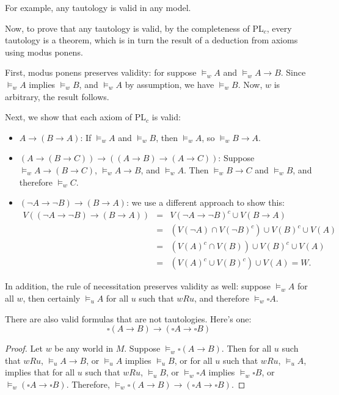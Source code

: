 \documentclass[12pt]{article}
\begin{document}
For example, any tautology is valid in any model.

Now, to prove that any tautology is valid, by the completeness of PL$_c$, every tautology is a theorem, which is in turn  the result of a deduction from axioms using modus ponens.

First, modus ponens preserves validity: for suppose $\models_w A$ and $\models_w A\to B$.  Since $\models_w A$ implies $\models_w B$, and $\models_w A$ by assumption, we have $\models_w B$.  Now, $w$ is arbitrary, the result follows.

Next, we show that each axiom of PL$_c$ is valid:
\begin{itemize}
\item $A\to (B\to A)$: If $\models_w A$ and $\models_w B$, then $\models_w A$, so $\models_w B\to A$.
\item $(A\to (B\to C))\to ((A\to B)\to (A\to C))$: Suppose $\models_w A\to (B\to C)$, $\models_w A\to B$, and $\models_w A$.  Then $\models_w B\to C$ and $\models_w B$, and therefore $\models_w C$.
\item $(\neg A\to \neg B)\to (B\to A)$: we use a different approach to show this: 
\begin{eqnarray*}
V((\neg A\to \neg B)\to (B\to A)) &=& V(\neg A\to \neg B)^c \cup V(B\to A) \\ &=& (V(\neg A)\cap V(\neg B)^c) \cup V(B)^c \cup V(A) \\ &=& (V(A)^c \cap V(B))\cup V(B)^c \cup V(A) \\ &=& (V(A)^c \cup V(B)^c) \cup V(A) = W.
\end{eqnarray*}

\end{itemize}

In addition, the rule of necessitation preserves validity as well: suppose $\models_w A$ for all $w$, then certainly $\models_u A$ for all $u$ such that $w R u$, and therefore $\models_w \square A$.

There are also valid formulas that are not tautologies.  Here's one: $$\square (A\to B) \to (\square A\to \square B)$$
\begin{proof}  Let $w$ be any world in $M$.  Suppose $\models_w \square (A\to B)$.  Then for all $u$ such that $w R u$, $\models_u A\to B$, or $\models_u A$ implies $\models_u B$, or for all $u$ such that $w R u$, $\models_u A$, implies that for all $u$ such that $w R u$, $\models_u B$, or $\models_w \square A$ implies $\models_w \square B$, or $\models_w (\square A\to \square B)$.  Therefore, $\models_w \square (A\to B) \to (\square A\to \square B)$.
\end{proof}
\end{document}
